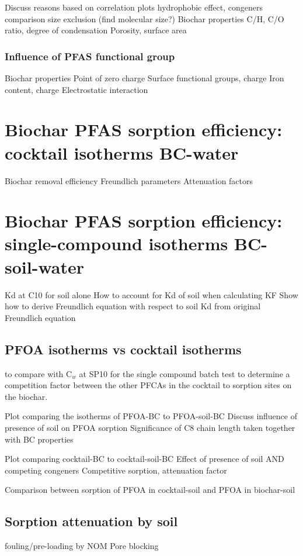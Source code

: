 Discuss reasons based on correlation plots
    hydrophobic effect, congeners comparison
    size exclusion (find molecular size?)
    Biochar properties
        C/H, C/O ratio, degree of condensation
        Porosity, surface area

\subsubsection{Influence of PFAS functional group}
Biochar properties
    Point of zero charge
    Surface functional groups, charge
    Iron content, charge
    Electrostatic interaction

\section{Biochar PFAS sorption efficiency: cocktail isotherms BC-water}
Biochar removal efficiency 
Freundlich parameters
Attenuation factors

\section{Biochar PFAS sorption efficiency: single-compound isotherms BC-soil-water}
Kd at C10 for soil alone
How to account for Kd of soil when calculating KF 
    Show how to derive Freundlich equation with respect to soil Kd from original Freundlich equation
    
\subsection{PFOA isotherms vs cocktail isotherms}
to compare with C$_w$ at SP10 for the single compound batch test to determine a competition factor between the other PFCAs in the cocktail to sorption sites on the biochar.

Plot comparing the isotherms of PFOA-BC to PFOA-soil-BC
Discuss influence of presence of soil on PFOA sorption
Significance of C8 chain length taken together with BC properties 

Plot comparing cocktail-BC to cocktail-soil-BC
Effect of presence of soil AND competing congeners
Competitive sorption, attenuation factor

Comparison between sorption of PFOA in cocktail-soil and PFOA in biochar-soil

\subsection{Sorption attenuation by soil}
fouling/pre-loading by NOM
Pore blocking

